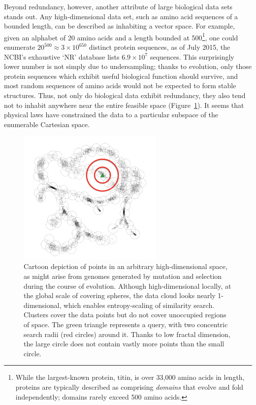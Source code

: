 \documentclass{acm_proc_article-sp}
\begin{document}
Beyond redundancy, however, another attribute of large biological data sets
stands out.
Any high-dimensional data set, such as amino acid sequences of a bounded 
length, can be described as inhabiting a vector space.
For example, given an alphabet of 20 amino acids and a length bounded at 
500\footnote{While the largest-known protein, titin, is over 33,000 amino acids 
in length, proteins are typically described as comprising \emph{domains} that 
evolve and fold independently; domains rarely exceed 500 amino acids.}, one 
could
enumerate $20^{500} \approx 3 \times 10^{650}$ distinct protein sequences, as 
of July 
2015, the NCBI's exhaustive `NR' database lists $6.9 \times 10^{7}$ sequences.
This surprisingly lower number is not simply due to undersampling; thanks to 
evolution, only those protein
sequences which exhibit useful biological function should survive, and most
random sequences of amino acids would not be expected to form stable structures.
Thus, not only do biological data exhibit redundancy, they also tend not to 
inhabit anywhere near the entire feasible space (Figure~\ref{fig:dataspace}).
It seems that physical laws have constrained the data to a particular subspace
of the enumerable Cartesian space.

\begin{figure}[htb!]
\centering
\includegraphics[width=2.8in]{assets/treepoints-fractal.png}
\caption{Cartoon depiction of points in an arbitrary high-dimensional space, 
as might arise from genomes generated by mutation and selection during the 
course of evolution. 
Although high-dimensional locally, at the global scale of covering spheres, the 
data cloud looks nearly 1-dimensional, which enables entropy-scaling of 
similarity search. Clusters cover the data points but do not cover unoccupied 
regions of space.
The green triangle represents a query, with two concentric search radii (red 
circles) around it. Thanks to low fractal dimension, the large circle does
not contain vastly more points than the small circle.}
\label{fig:dataspace}
\end{figure}
\end{document}
